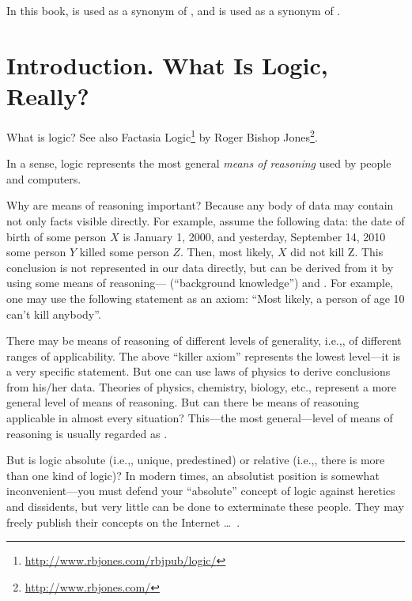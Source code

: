 \begin{remark}[]
In this book,  is used as a synonym of , and  is used as a synonym of .
\end{remark}

\section{Introduction. What Is Logic, Really?}

What is logic?
See also Factasia Logic\footnote{\url{http://www.rbjones.com/rbjpub/logic/}} by Roger Bishop Jones\footnote{\url{http://www.rbjones.com/}}.

In a sense, logic represents the most general \emph{means of reasoning} used by people and computers.

Why are means of reasoning important?
Because any body of data may contain not only facts visible directly.
For example, assume the following data: the date of birth of some person \(X\) is January 1, 2000,
and yesterday, September 14, 2010 some person \(Y\) killed some person \(Z\).
Then, most likely, \(X\) did not kill Z.
This conclusion is not represented in our data directly, but can be derived from it by using some means of reasoning--- (``background knowledge'') and .
For example, one may use the following statement as an axiom: ``Most likely, a person of age 10 can't kill anybody''.

There may be means of reasoning of different levels of generality, i.e.,, of different ranges of applicability.
The above ``killer axiom'' represents the lowest level---it is a very specific statement.
But one can use laws of physics to derive conclusions from his/her data.
Theories of physics, chemistry, biology, etc., represent a more general level of means of reasoning.
But can there be means of reasoning applicable in almost every situation?
This---the most general---level of means of reasoning is usually regarded as .

But is logic absolute (i.e.,, unique, predestined) or relative (i.e.,, there is more than one kind of logic)?
In modern times, an absolutist position is somewhat inconvenient---you must defend your ``absolute'' concept of logic against heretics and dissidents, but very little can be done to exterminate these people.
They may freely publish their concepts on the Internet \ldots~.

